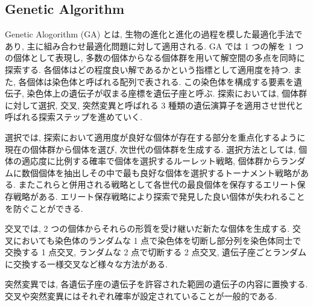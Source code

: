 \documentclass[12pt]{jarticle}
\begin{document}
\subsection{Genetic Algorithm}
Genetic Alogorithm (GA) とは, 生物の進化と進化の過程を模した最適化手法であり, 主に組み合わせ最適化問題に対して適用される. GA では 1 つの解を 1 つの個体として表現し, 多数の個体からなる個体群を用いて解空間の多点を同時に探索する. 各個体はどの程度良い解であるかという指標として適用度を持つ. また, 各個体は染色体と呼ばれる配列で表される. この染色体を構成する要素を遺伝子, 染色体上の遺伝子が収まる座標を遺伝子座と呼ぶ. 探索においては, 個体群に対して選択, 交叉, 突然変異と呼ばれる 3 種類の遺伝演算子を適用させ世代と呼ばれる探索ステップを進めていく.\par
選択では, 探索において適用度が良好な個体が存在する部分を重点化するように現在の個体群から個体を選び, 次世代の個体群を生成する. 選択方法としては, 個体の適応度に比例する確率で個体を選択するルーレット戦略, 個体群からランダムに数個個体を抽出しその中で最も良好な個体を選択するトーナメント戦略がある. またこれらと併用される戦略として各世代の最良個体を保存するエリート保存戦略がある. エリート保存戦略により探索で発見した良い個体が失われることを防ぐことができる. \par
交叉では, 2 つの個体からそれらの形質を受け継いだ新たな個体を生成する. 交叉においても染色体のランダムな 1 点で染色体を切断し部分列を染色体同士で交換する 1 点交叉, ランダムな 2 点で切断する 2 点交叉, 遺伝子座ごとランダムに交換する一様交叉など様々な方法がある. \par
突然変異では, 各遺伝子座の遺伝子を許容された範囲の遺伝子の内容に置換する.
交叉や突然変異にはそれぞれ確率が設定されていることが一般的である. 
\end{document}
